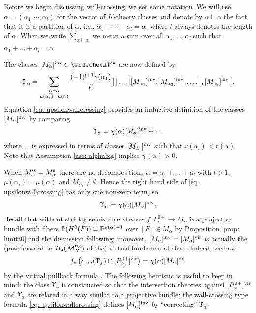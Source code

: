 \documentclass[a4paper, 12pt]{amsart}
\begin{document}
Before we begin discussing wall-crossing, we set some notation. We will use $\underline{\alpha} = (\alpha_1,\cdots,\alpha_l)$ for the vector of $K$-theory classes and denote by $\underline{\alpha}\vdash \alpha$ the fact that it is a partition of $\alpha$, i.e., $\alpha_1+\cdots +\alpha_l = \alpha$, where $l$ always denotes the length of $\alpha$. When we write $\sum_{\underline{\alpha}\vdash \alpha}$ we mean a sum over all $\alpha_1, \ldots, \alpha_l$ such that $\alpha_1+\ldots+ \alpha_l=\alpha$.

The classes $[M_\alpha]^\inva\in \widecheck V^\bullet$ are now defined by
\begin{equation}
\Upsilon_\alpha=\sum_{\substack{\underline{\alpha}\vdash \alpha\\\mu(\alpha_i)=\mu(\alpha)}}\frac{(-1)^{l+1}\chi(\alpha_1)}{l!}\big[\big[\ldots  \big[ [M_{\alpha_1}]^{\mathrm{inv}},[M_{\alpha_2}]^{\mathrm{inv}} \big],\ldots \big ],[M_{\alpha_l}]^{\mathrm{inv}} \big]\label{eq: upsilonwallcrossing}\,.
\end{equation}
Equation \eqref{eq: upsilonwallcrossing} provides an inductive definition of the classes $[M_{\alpha}]^{\mathrm{inv}}$ by comparing
\[\Upsilon_\alpha=\chi(\alpha)[M_\alpha]^{\mathrm{inv}}+\ldots\]
where $\ldots$ is expressed in terms of classes $[M_{\alpha_i}]^{\mathrm{inv}}$ such that $r(\alpha_i)<r(\alpha).$ Note that Assumption \ref{ass: alphabig} implies $\chi(\alpha)>0$.


\begin{remark}\label{rem: projectivebundle}
When $M_\alpha^{\textup{ss}}=M_\alpha^{\textup{s}}$ there are no decompositions $\alpha=\alpha_1+\ldots+\alpha_l$ with $l>1$, $\mu(\alpha_i)=\mu(\alpha)$ and $M_{\alpha_i}\neq \emptyset$. Hence the right hand side of \eqref{eq: upsilonwallcrossing} has only one non-zero term, so
\[\Upsilon_\alpha=\chi(\alpha)[M_\alpha]^{\mathrm{inv}}. \]
Recall that without strictly semistable sheaves $f\colon P_\alpha^{0+}\to M_\alpha$ is a projective bundle with fibers ${\mathbb{P}}(H^0(F))\cong {\mathbb{P}}^{\chi(\alpha)-1}$ over $[F]\in M_\alpha$ by Proposition \ref{prop: limitt0} and the discussion following; moreover, $[M_\alpha]^{\mathrm{inv}}=[M_\alpha]^{\mathrm{vir}}$ is actually the (pushforward to $H_\bullet(\mathcal{M}_X^{\mathrm{rig}})$ of the) virtual fundamental class. Indeed, we have
\[f_\ast\left(c_{\mathrm{top}}(\mathrm{T}_f)\cap [P_\alpha^{0+}]^{\mathrm{vir}}\right)=\chi(\alpha)[M_\alpha]^{\mathrm{vir}}\]
by the virtual pullback formula \cite[Theorem 4.7]{manolache}.
The following heuristic is useful to keep in mind: the class $\Upsilon_\alpha$ is constructed so that the intersection theories against $[P_\alpha^{0+}]^{\mathrm{vir}}$ and $\Upsilon_\alpha$ are related in a way similar to a projective bundle; the wall-crossing type formula \eqref{eq: upsilonwallcrossing} defines $[M_\alpha]^{\mathrm{inv}}$ by ``correcting'' $\Upsilon_\alpha$.
\end{remark}
\end{document}
